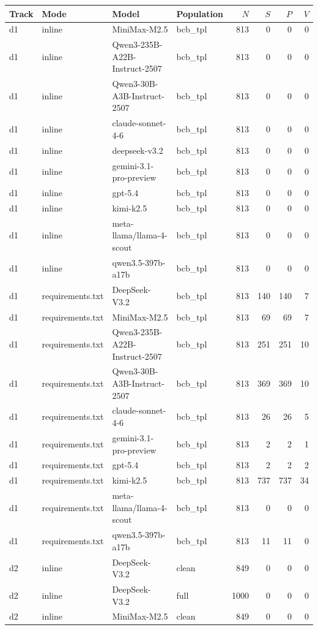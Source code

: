 \begin{tabular}{llllrrrr}
\toprule
Track & Mode & Model & Population & $N$ & $S$ & $P$ & $V$ \\
\midrule
d1 & inline & MiniMax-M2.5 & bcb\_tpl & 813 & 0 & 0 & 0 \\
d1 & inline & Qwen3-235B-A22B-Instruct-2507 & bcb\_tpl & 813 & 0 & 0 & 0 \\
d1 & inline & Qwen3-30B-A3B-Instruct-2507 & bcb\_tpl & 813 & 0 & 0 & 0 \\
d1 & inline & claude-sonnet-4-6 & bcb\_tpl & 813 & 0 & 0 & 0 \\
d1 & inline & deepseek-v3.2 & bcb\_tpl & 813 & 0 & 0 & 0 \\
d1 & inline & gemini-3.1-pro-preview & bcb\_tpl & 813 & 0 & 0 & 0 \\
d1 & inline & gpt-5.4 & bcb\_tpl & 813 & 0 & 0 & 0 \\
d1 & inline & kimi-k2.5 & bcb\_tpl & 813 & 0 & 0 & 0 \\
d1 & inline & meta-llama/llama-4-scout & bcb\_tpl & 813 & 0 & 0 & 0 \\
d1 & inline & qwen3.5-397b-a17b & bcb\_tpl & 813 & 0 & 0 & 0 \\
d1 & requirements.txt & DeepSeek-V3.2 & bcb\_tpl & 813 & 140 & 140 & 7 \\
d1 & requirements.txt & MiniMax-M2.5 & bcb\_tpl & 813 & 69 & 69 & 7 \\
d1 & requirements.txt & Qwen3-235B-A22B-Instruct-2507 & bcb\_tpl & 813 & 251 & 251 & 10 \\
d1 & requirements.txt & Qwen3-30B-A3B-Instruct-2507 & bcb\_tpl & 813 & 369 & 369 & 10 \\
d1 & requirements.txt & claude-sonnet-4-6 & bcb\_tpl & 813 & 26 & 26 & 5 \\
d1 & requirements.txt & gemini-3.1-pro-preview & bcb\_tpl & 813 & 2 & 2 & 1 \\
d1 & requirements.txt & gpt-5.4 & bcb\_tpl & 813 & 2 & 2 & 2 \\
d1 & requirements.txt & kimi-k2.5 & bcb\_tpl & 813 & 737 & 737 & 34 \\
d1 & requirements.txt & meta-llama/llama-4-scout & bcb\_tpl & 813 & 0 & 0 & 0 \\
d1 & requirements.txt & qwen3.5-397b-a17b & bcb\_tpl & 813 & 11 & 11 & 0 \\
d2 & inline & DeepSeek-V3.2 & clean & 849 & 0 & 0 & 0 \\
d2 & inline & DeepSeek-V3.2 & full & 1000 & 0 & 0 & 0 \\
d2 & inline & MiniMax-M2.5 & clean & 849 & 0 & 0 & 0 \\

\end{tabular}
